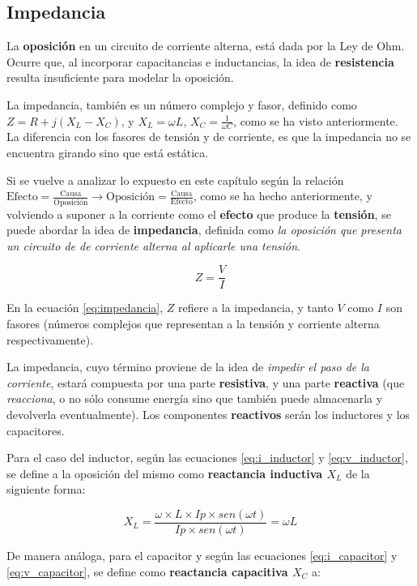 \subsection{Impedancia}

La \textbf{oposición} en un circuito de corriente alterna, está dada por la Ley de Ohm. Ocurre que, al incorporar capacitancias e inductancias, la idea de \textbf{resistencia} resulta insuficiente para modelar la oposición.

La impedancia, también es un número complejo y fasor, definido como $Z= R+j(X_L - X_C)$, y $X_L = \omega L $, $X_C = \frac{1}{\omega C}$, como se ha visto anteriormente. La diferencia con los fasores de tensión y de corriente, es que la impedancia no se encuentra girando sino que está estática.

Si se vuelve a analizar lo expuesto en este capítulo según la relación $\text{Efecto} = \frac{\text{Causa}}{\text{Oposición}} \rightarrow \text{Oposición} = \frac{\text{Causa}}{\text{Efecto}}$, como se ha hecho anteriormente, y volviendo a suponer a la corriente como el \textbf{efecto} que produce la \textbf{tensión}, se puede abordar la idea de \textbf{impedancia}, definida como \textit{la oposición que presenta un circuito de de corriente alterna al aplicarle una tensión}.

\begin{equation}
	\label{eq:impedancia}
	Z=\frac{V}{I}
\end{equation}

En la ecuación \ref{eq:impedancia}, $Z$ refiere a la impedancia, y tanto $V$ como $I$ son fasores (números complejos que representan a la tensión y corriente alterna respectivamente).

La impedancia, cuyo término proviene de la idea de \textit{impedir el paso de la corriente}, estará compuesta por una parte \textbf{resistiva}, y una parte \textbf{reactiva} (que \textit{reacciona}, o no sólo consume energía sino que también puede almacenarla y devolverla eventualmente). Los componentes \textbf{reactivos} serán los inductores y los capacitores.

Para el caso del inductor, según las ecuaciones \ref{eq:i_inductor} y \ref{eq:v_inductor}, se define a la oposición del mismo como \textbf{reactancia inductiva $X_L$} de la siguiente forma:

$$ X_L = \frac{\omega \times L \times Ip \times sen(\omega t)}{Ip\times sen(\omega t)} = \omega L $$

De manera análoga, para el capacitor y según las ecuaciones \ref{eq:i_capacitor} y \ref{eq:v_capacitor}, se define como \textbf{reactancia capacitiva $X_C$} a:

